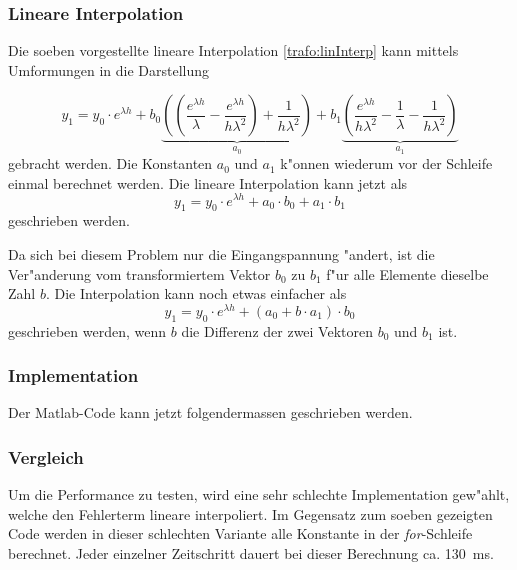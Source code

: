 \begin{refsection}
\subsubsection{Lineare Interpolation}
Die soeben vorgestellte lineare Interpolation \ref{trafo:linInterp} kann mittels Umformungen in die Darstellung 

\begin{equation*}
	y_1 = y_0 \cdot e^{\lambda h} + b_0 \underbrace{\left(\left(\frac{e^{\lambda h}}{\lambda} - \frac{e^{\lambda h}}{h\lambda ^2}\right) + \frac{1}{h \lambda^2}\right)}_{\displaystyle a_0} + b_1 \underbrace{\left(\frac{e^{\lambda h}}{h \lambda^2} - \frac{1}{\lambda} - \frac{1}{h \lambda^2}\right)}_{\displaystyle a_1}
\end{equation*} 
gebracht werden. Die Konstanten $a_0$ und $a_1$ k"onnen wiederum vor der Schleife einmal berechnet werden. Die lineare Interpolation kann jetzt als 
\begin{equation*}
	y_1 = y_0 \cdot e^{\lambda h} + a_0 \cdot b_0 + a_1 \cdot b_1
\end{equation*}
geschrieben werden. 

Da sich bei diesem Problem nur die Eingangspannung "andert, ist die Ver"anderung vom transformiertem Vektor $b_0$ zu $b_1$ f"ur alle Elemente dieselbe Zahl $b$. Die Interpolation kann noch etwas einfacher als
\begin{equation*}
	y_1 = y_0 \cdot e^{\lambda h} + (a_0 + b \cdot  a_1) \cdot b_0
\end{equation*}
geschrieben werden, wenn $b$ die Differenz der zwei Vektoren $b_0$ und $b_1$ ist. 

\subsubsection{Implementation}
Der Matlab-Code kann jetzt folgendermassen geschrieben werden.

{\scriptsize }


\subsubsection{Vergleich}

Um die Performance zu testen, wird eine sehr schlechte Implementation gew"ahlt, welche den Fehlerterm lineare interpoliert. Im Gegensatz zum soeben gezeigten Code werden in dieser schlechten Variante alle Konstante in der \textit{for}-Schleife berechnet. Jeder einzelner Zeitschritt dauert bei dieser Berechnung ca. \SI{130}{\milli\second}. 


\end{refsection}

